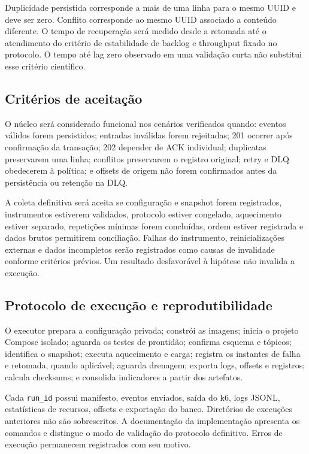 Duplicidade persistida corresponde a mais de uma linha para o mesmo UUID e deve ser zero. Conflito corresponde ao mesmo UUID associado a conteúdo diferente. O tempo de recuperação será medido desde a retomada até o atendimento do critério de estabilidade de backlog e throughput fixado no protocolo. O tempo até lag zero observado em uma validação curta não substitui esse critério científico.

\subsection{Critérios de aceitação}
O núcleo será considerado funcional nos cenários verificados quando: eventos válidos forem persistidos; entradas inválidas forem rejeitadas; 201 ocorrer após confirmação da transação; 202 depender de ACK individual; duplicatas preservarem uma linha; conflitos preservarem o registro original; retry e DLQ obedecerem à política; e offsets de origem não forem confirmados antes da persistência ou retenção na DLQ.

A coleta definitiva será aceita se configuração e snapshot forem registrados, instrumentos estiverem validados, protocolo estiver congelado, aquecimento estiver separado, repetições mínimas forem concluídas, ordem estiver registrada e dados brutos permitirem conciliação. Falhas do instrumento, reinicializações externas e dados incompletos serão registrados como causas de invalidade conforme critérios prévios. Um resultado desfavorável à hipótese não invalida a execução.

\subsection{Protocolo de execução e reprodutibilidade}
O executor prepara a configuração privada; constrói as imagens; inicia o projeto Compose isolado; aguarda os testes de prontidão; confirma esquema e tópicos; identifica o snapshot; executa aquecimento e carga; registra os instantes de falha e retomada, quando aplicável; aguarda drenagem; exporta logs, offsets e registros; calcula checksums; e consolida indicadores a partir dos artefatos.

Cada \texttt{run\_id} possui manifesto, eventos enviados, saída do k6, logs JSONL, estatísticas de recursos, offsets e exportação do banco. Diretórios de execuções anteriores não são sobrescritos. A documentação da implementação apresenta os comandos e distingue o modo de validação do protocolo definitivo. Erros de execução permanecem registrados com seu motivo.

